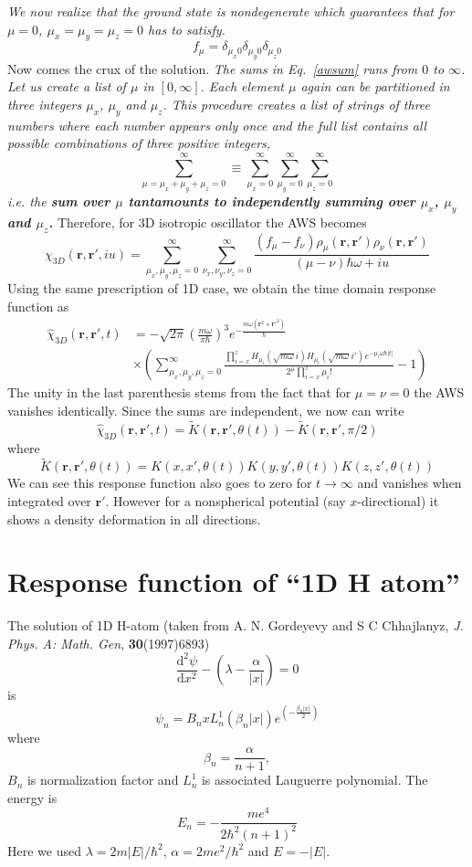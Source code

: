 \documentclass{article}
\newcommand{\eq}{\begin{equation}}
\newcommand{\qe}{\end{equation}}
\newcommand{\lp}{\left(}
\newcommand{\rp}{\right)}
\newcommand{\diff}{\mathrm{d}}
\newcommand{\rr}{\mathbf{r}}
\newcommand{\abs}[1]{\vert #1\vert}
\newcommand{\ie}{\emph{i.e. }}
\begin{document}
\emph{We now realize that the ground state is nondegenerate which guarantees that for $\mu = 0$, $\mu_{x} = \mu_{y} = \mu_{z} = 0$ has to satisfy.} 
\eq
f_{\mu} = \delta_{\mu_{x}0}\delta_{\mu_{y}0}\delta_{\mu_{z}0}
\qe
  Now comes the crux of the solution. \emph{The sums in Eq.~\eqref{awsum} runs from $0$ to $\infty$. Let us create a list of $\mu$ in $[0,\infty]$. Each element $\mu$ again can be partitioned in three integers $\mu_{x}$, $\mu_{y}$ and $\mu_{z}$. This procedure creates a list of strings of three numbers where each number appears only once and the full list contains all possible combinations of three positive integers, }
\eq
\sum_{\mu= \mu_{x}+\mu_{y}+\mu_{z}= 0}^{\infty} \equiv \sum_{\mu_{x}=0}^{\infty}\sum_{\mu_{y}=0}^{\infty}\sum_{\mu_{z}= 0}^{\infty} 
\qe
 \emph{ \ie the \textbf{sum over $\mu $ tantamounts to independently summing over $\mu_{x}$, $\mu_{y}$ and $\mu_{z}$.}} Therefore, for 3D isotropic oscillator the AWS becomes
\eq
\chi_{3D}(\rr, \rr',i u) = \sum_{\mu_{x},\mu_{y},\mu_{z} = 0}^{\infty}  \sum_{\nu_{x},\nu_{y},\nu_{z} = 0}^{\infty} \frac{(f_{\mu}-f_{\nu})\rho_{\mu}(\rr, \rr')\rho_{\nu}(\rr, \rr')}{(\mu-\nu)\hbar\omega + i u}
\qe 
Using the same prescription of 1D case, we obtain the time domain response function as 
\eq
\begin{split}
\hat{\chi}_{3D}(\rr, \rr', t)& =-\sqrt{2\pi} \lp\frac{m \omega}{ \pi\hbar}\rp^{3} e^{-\frac{m\omega(\rr^2+\rr'^2)}{\hbar}} \\
&\times \left( \sum_{\mu_{x},\mu_{y},\mu_{z} = 0}^{\infty} \frac{\prod_{i = x}^{z}H_{\mu_{i}}(\sqrt{m \omega} i)H_{\mu_{i}}(\sqrt{m \omega} i')e^{-\mu_{i}\omega\hbar\abs{t}}}{2^{\mu}\prod_{i = x}^{z}\mu_{i}!} - 1\right)
\end{split}
\qe
The unity in the last parenthesis stems from the fact that for $\mu=\nu=0$ the AWS vanishes identically. Since the sums are independent, we now can write
\eq
\hat{\chi}_{3D}(\rr, \rr', t) = \tilde K(\rr, \rr', \theta(t))- \tilde K(\rr, \rr', \pi/2)
\qe
where 
\eq
  \tilde K(\rr, \rr', \theta(t))= K(x, x', \theta(t)) K(y, y', \theta(t)) K(z, z', \theta(t))
\qe
We can see this response function also goes to zero for $t \rightarrow \infty$ and vanishes when integrated over $\rr'$. However for a nonspherical potential (say $x$-directional) it shows a density deformation in all directions.  
\section{Response function of ``1D H atom''}
The solution of 1D H-atom (taken from A. N. Gordeyevy and S C Chhajlanyz, \emph{J. Phys. A: Math. Gen}, \textbf{30}(1997)6893)
\eq
\frac{\diff^2 \psi}{\diff x^2} -\left( \lambda - \frac{\alpha}{\abs{x}}\right) = 0
\qe 
is 
\eq
\psi_{n} = B_{n} x L_{n}^{1}(\beta_{n}\abs{x})e^{\left(-\frac{\beta_{n}\abs{x}}{2}\right)}
\qe
where 
\eq
\beta_n = \frac{\alpha}{n+1},
\qe
$B_n$ is normalization factor and $L_{n}^{1}$ is associated Lauguerre polynomial. 
The energy is
\eq
E_n= -\frac{m e^4}{2 \hbar^2(n+1)^2}
\qe
Here we used $\lambda = 2m\abs{E}/\hbar^2$, $\alpha = 2m e^2/\hbar^2$ and $E = -\abs{E}$. 
\end{document}
